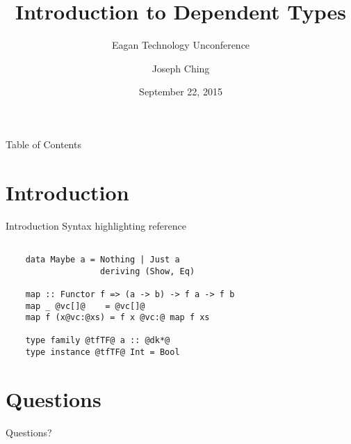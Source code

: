 \documentclass[xcolor={usenames,dvipsnames}]{beamer}
\title{Introduction to Dependent Types}
\subtitle{Eagan Technology Unconference}
\author{Joseph Ching}
\date{September 22, 2015}
\begin{document}
\begin{frame}[plain]
  \titlepage
\end{frame}


\begin{frame}{Table of Contents}
  \tableofcontents[pausesections]
\end{frame}


\section{Introduction}

\begin{frame}[fragile]{Introduction}
  Syntax highlighting reference

  \begin{lstlisting}[style=hask]

    data Maybe a = Nothing | Just a
                   deriving (Show, Eq)

    map :: Functor f => (a -> b) -> f a -> f b
    map _ @vc[]@    = @vc[]@
    map f (x@vc:@xs) = f x @vc:@ map f xs

    type family @tfTF@ a :: @dk*@
    type instance @tfTF@ Int = Bool
  \end{lstlisting}
\end{frame}

\begin{frame}[fragile]
\end{frame}


\section{Questions}

\begin{frame}
  Questions?
\end{frame}
\end{document}
